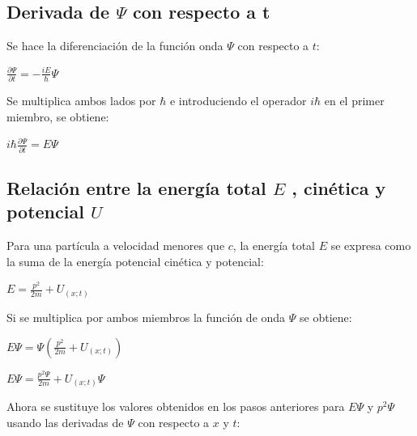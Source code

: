 \documentclass[a4paper]{article}
\begin{document}
        \subsection{Derivada de $\Psi$ con respecto a t}
             \indent Se hace la diferenciación de la función onda $\Psi$ con respecto a $t$:
            \begin{center}
                $\frac{\partial \Psi}{\partial t} = - \frac{iE}{\hbar} \Psi$
            \end{center}

            \saltoPag

            Se multiplica ambos lados por $\hbar$ e introduciendo el operador $i \hbar$ en el primer miembro, se obtiene:

            \begin{center}
                $i \hbar \frac{\partial \Psi}{\partial t} = E \Psi $
            \end{center}

        \subsection{Relación entre la energía total $E$ , cinética y potencial $U$}
            \indent Para una partícula a velocidad menores que $c$, la energía total $E$ se expresa como la suma de la energía potencial cinética y potencial:
            
            \begin{center}
                $E = \frac{p^2}{2m} + U_{(x;t)}$
            \end{center}

            Si se multiplica por ambos miembros la función de onda $\Psi$ se obtiene:

            \begin{center}
                $E \Psi = \Psi (\frac{p^2}{2m} + U_{(x;t)})$
            \end{center}
            
            \begin{center}
            $E \Psi = \frac{p^2 \Psi}{2m} + U_{(x;t)} \Psi$
            \end{center}
           
            Ahora se sustituye los valores obtenidos en los pasos anteriores para $E \Psi$ y $p^2 \Psi $ usando las derivadas de $\Psi$ con respecto a $x$ y $t$:

            \renewcommand{\theenumi}{\roman{enumi}}
\end{document}
